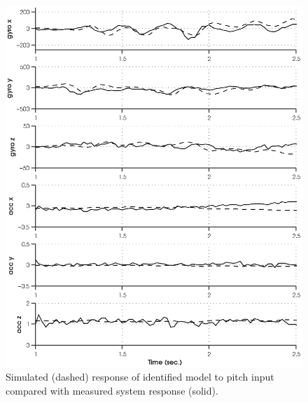 \newpage
\begin{figure}[htb!]
	\centering
	\includegraphics{../fig/sim_1760_pitch.eps}
	\caption{Simulated (dashed) response of identified model to pitch input compared with measured system response (solid).}
\end{figure}\clearpage

